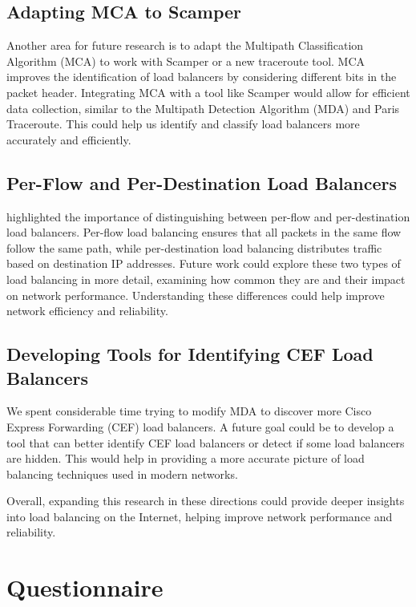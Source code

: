 \documentclass[12pt]{cwru_thesis}
\begin{document}
\section*{Adapting MCA to Scamper}

Another area for future research is to adapt the Multipath Classification Algorithm (MCA) to work with Scamper or a new traceroute tool. MCA improves the identification of load balancers by considering different bits in the packet header. Integrating MCA with a tool like Scamper would allow for efficient data collection, similar to the Multipath Detection Algorithm (MDA) and Paris Traceroute. This could help us identify and classify load balancers more accurately and efficiently.

\section*{Per-Flow and Per-Destination Load Balancers}

\textbf{\cite{4261334}} highlighted the importance of distinguishing between per-flow and per-destination load balancers. Per-flow load balancing ensures that all packets in the same flow follow the same path, while per-destination load balancing distributes traffic based on destination IP addresses. Future work could explore these two types of load balancing in more detail, examining how common they are and their impact on network performance. Understanding these differences could help improve network efficiency and reliability.

\section*{Developing Tools for Identifying CEF Load Balancers}

We spent considerable time trying to modify MDA to discover more Cisco Express Forwarding (CEF) load balancers. A future goal could be to develop a tool that can better identify CEF load balancers or detect if some load balancers are hidden. This would help in providing a more accurate picture of load balancing techniques used in modern networks.

Overall, expanding this research in these directions could provide deeper insights into load balancing on the Internet, helping improve network performance and reliability.


\appendix

\chapter{Questionnaire}

\printbibliography[heading=bibintoc]
\end{document}
